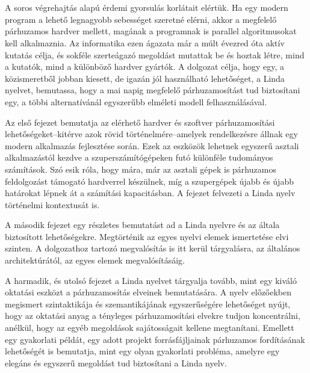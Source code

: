 \chapter{\bevezetes}

A soros végrehajtás alapú érdemi gyorsulás korlátait elértük.
Ha egy modern program a lehető legnagyobb sebességet szeretné elérni, akkor a megfelelő párhuzamos hardver mellett, magának a programnak is parallel algoritmusokat kell alkalmaznia.
Az informatika ezen ágazata már a múlt évezred óta aktív kutatás célja, és sokféle szerteágazó megoldást mutattak be és hoztak létre, mind a kutatók, mind a különböző hardver gyártók.
A dolgozat célja, hogy egy, a közismeretből jobban kiesett, de igazán jól használható lehetőséget, a Linda nyelvet, bemutassa, hogy a mai napig megfelelő párhuzamosítást tud biztosítani egy, a többi alternatívánál egyszerűbb elméleti modell felhasználásával.

Az első fejezet bemutatja az elérhető hardver és szoftver párhuzamosítási lehetőségeket--kitérve azok rövid történelmére--amelyek rendelkezésre állnak egy modern alkalmazás fejlesztése során.
Ezek az eszközök lehetnek egyszerű asztali alkalmazástól kezdve a szuperszámítógépeken futó különféle tudományos számítások.
Szó esik róla, hogy mára, már az asztali gépek is párhuzamos feldolgozást támogató hardverrel készülnek, míg a szupergépek újabb és újabb határokat lépnek át a számítási kapacitásban. %
A fejezet felvezeti a Linda nyelv történelmi kontextusát is.

A második fejezet egy részletes bemutatást ad a Linda nyelvre és az általa biztosított lehetőségekre.
Megtörténik az egyes nyelvi elemek ismertetése elvi szinten.
A dolgozathoz tartozó megvalósítás is itt kerül tárgyalásra, az általános architektúrától, az egyes elemek megvalósításáig.

A harmadik, és utolsó fejezet a Linda nyelvet tárgyalja tovább, mint egy kiváló oktatási eszközt a párhuzamosítás elveinek bemutatására.
A nyelv előzőekben megismert szintaktikája és szemantikájának egyszerűségére lehetőséget nyújt, hogy az oktatási anyag a tényleges párhuzamosítási elvekre tudjon koncentrálni, anélkül, hogy az egyéb megoldások sajátosságait kellene megtanítani.
Emellett egy gyakorlati példát, egy adott projekt forrásfájljainak párhuzamos fordításának lehetőségét is bemutatja, mint egy olyan gyakorlati probléma, amelyre egy elegáns és egyszerű megoldást tud biztosítani a Linda nyelv.


